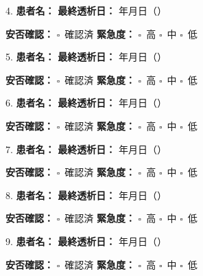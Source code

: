 \documentclass[a4paper,12pt]{jarticle}
\newcommand{\checkbox}{$\square$\ }
\newcommand{\underlinespace}[1]{\underline{\hspace{#1}}}
\begin{document}
\vspace{4mm}

4. \textbf{患者名：} \underlinespace{3cm} \quad \textbf{最終透析日：} \underlinespace{1.5cm}年\underlinespace{1cm}月\underlinespace{1cm}日（\underlinespace{1cm}）

\quad \textbf{安否確認：} \checkbox 確認済 \quad \textbf{緊急度：} \checkbox 高 \checkbox 中 \checkbox 低

\vspace{4mm}

5. \textbf{患者名：} \underlinespace{3cm} \quad \textbf{最終透析日：} \underlinespace{1.5cm}年\underlinespace{1cm}月\underlinespace{1cm}日（\underlinespace{1cm}）

\quad \textbf{安否確認：} \checkbox 確認済 \quad \textbf{緊急度：} \checkbox 高 \checkbox 中 \checkbox 低

\vspace{4mm}

6. \textbf{患者名：} \underlinespace{3cm} \quad \textbf{最終透析日：} \underlinespace{1.5cm}年\underlinespace{1cm}月\underlinespace{1cm}日（\underlinespace{1cm}）

\quad \textbf{安否確認：} \checkbox 確認済 \quad \textbf{緊急度：} \checkbox 高 \checkbox 中 \checkbox 低

\vspace{4mm}

7. \textbf{患者名：} \underlinespace{3cm} \quad \textbf{最終透析日：} \underlinespace{1.5cm}年\underlinespace{1cm}月\underlinespace{1cm}日（\underlinespace{1cm}）

\quad \textbf{安否確認：} \checkbox 確認済 \quad \textbf{緊急度：} \checkbox 高 \checkbox 中 \checkbox 低

\vspace{4mm}

8. \textbf{患者名：} \underlinespace{3cm} \quad \textbf{最終透析日：} \underlinespace{1.5cm}年\underlinespace{1cm}月\underlinespace{1cm}日（\underlinespace{1cm}）

\quad \textbf{安否確認：} \checkbox 確認済 \quad \textbf{緊急度：} \checkbox 高 \checkbox 中 \checkbox 低

\vspace{4mm}

9. \textbf{患者名：} \underlinespace{3cm} \quad \textbf{最終透析日：} \underlinespace{1.5cm}年\underlinespace{1cm}月\underlinespace{1cm}日（\underlinespace{1cm}）

\quad \textbf{安否確認：} \checkbox 確認済 \quad \textbf{緊急度：} \checkbox 高 \checkbox 中 \checkbox 低
\end{document}
